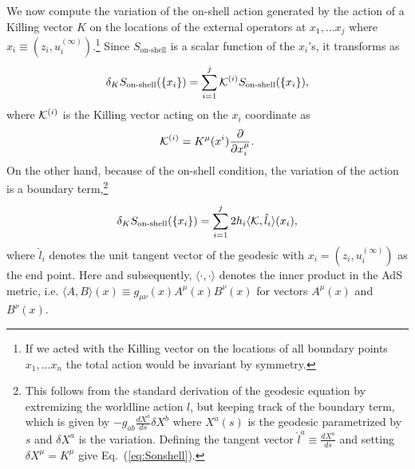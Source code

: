 \documentclass[12pt]{article}
\begin{document}
We now compute the variation of the on-shell action
generated by the action of a Killing vector $K$ on the locations of the external operators at $x_1, \ldots x_j$ where $x_i\equiv (z_i,u_i^{(\infty)})$.\footnote{If we acted with the Killing vector on the locations of all boundary points $x_1, \ldots x_n$ the total action would be invariant by symmetry.}  Since $S_{\text{on-shell}}$ is a scalar function of the $x_i$'s, it transforms as
 \begin{equation}
\delta_K S_{\text{on-shell}}(\{x_i\})=
 \sum_{i=1}^{j} {\cal{K}}^{(i)} S_{\text{on-shell}}(\{x_i\}),
  \end{equation}
%
where ${\cal{K}}^{(i)}$ is the Killing vector acting on the $x_{i}$ coordinate as
\begin{equation} {\cal{K}}^{(i)}=K^\mu(x^i) \frac{\partial}{\partial x^{\mu}_{i}}. \end{equation}
On the other hand, because of the on-shell condition, the variation of the action is a boundary term,\footnote{\label{fn1}This follows from the standard derivation of the geodesic equation by extremizing  the worldline action $l$, but keeping track of the boundary term, which is given by $- g_{ab}\frac{dX^a}{ds}\delta X^b$ where $X^a(s)$ is the geodesic parametrized by $s$ and $\delta X^a$ is the variation. Defining the tangent vector $\hat{l}^a\equiv \frac{dX^a}{ds}$ and setting $\delta X^\mu =K^\mu$ give Eq.~(\ref{eq:Sonshell}).}
\begin{equation}\label{eq:Sonshell}
\delta_K S_{\text{on-shell}}(\{x_i\})=
\sum_{i=1}^j
2h_{i}
\langle {\cal K},\hat{l}_{i}
\rangle(x_i)
,
 \end{equation}
where $\hat{l}_{i}$ denotes the unit tangent vector of the geodesic with $x_{i}=(z_i,u_i^{(\infty)})$ as the end point.
Here and subsequently, $\langle \cdot , \cdot \rangle$ denotes the inner product in the AdS metric, i.e. $\langle  A ,B \rangle(x)
\equiv g_{\mu\nu}(x) A^\mu(x) B^\nu(x)$ for vectors $A^\mu(x)$ and $B^\nu(x)$.
\end{document}

